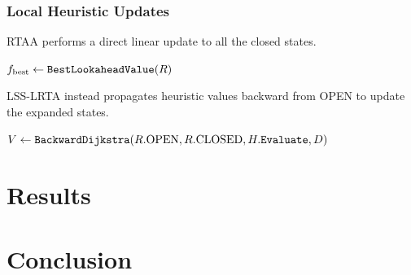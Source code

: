 \documentclass[11pt]{article}
\begin{document}
\subsubsection{Local Heuristic Updates}

RTAA performs a direct linear update to all the closed states.

\begin{algorithm}[H]
  \caption{RTAA local heuristic update}
  \label{alg:rtaa-update}
  \(f_{\mathrm{best}} \gets \FuncSty{BestLookaheadValue}(R)\)\;
\end{algorithm}

LSS-LRTA instead propagates heuristic values backward from OPEN to update the expanded states.

\begin{algorithm}[H]
  \caption{LSS-LRTA local heuristic update}
  \label{alg:lss-lrta-update}
  \(V \gets
  \FuncSty{BackwardDijkstra}(R.\mathrm{OPEN},R.\mathrm{CLOSED},
  H.\FuncSty{Evaluate},D)\)\;
\end{algorithm}

\section{Results}

\section{Conclusion}

\clearpage
{}


\end{document}
